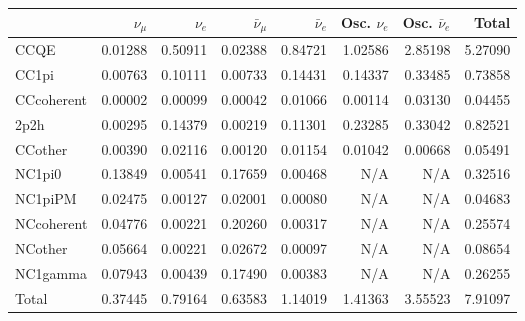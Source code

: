 \begin{tabular} { | l ||r | r | r | r | r | r | | r | }
\hline
              & $\nu_\mu$            & $\nu_e$              & $\bar{\nu}_{\mu}$    & $\bar{\nu}_{e}$      & Osc. $\nu_e$         & Osc. $\bar{\nu}_{e}$ & Total                \\ \hline\hline
 CCQE         & 0.01288              & 0.50911              & 0.02388              & 0.84721              & 1.02586              & 2.85198              & 5.27090              \\ \hline
 CC1pi        & 0.00763              & 0.10111              & 0.00733              & 0.14431              & 0.14337              & 0.33485              & 0.73858              \\ \hline
 CCcoherent   & 0.00002              & 0.00099              & 0.00042              & 0.01066              & 0.00114              & 0.03130              & 0.04455              \\ \hline
 2p2h         & 0.00295              & 0.14379              & 0.00219              & 0.11301              & 0.23285              & 0.33042              & 0.82521              \\ \hline
 CCother      & 0.00390              & 0.02116              & 0.00120              & 0.01154              & 0.01042              & 0.00668              & 0.05491              \\ \hline
 NC1pi0       & 0.13849              & 0.00541              & 0.17659              & 0.00468              & N/A                  & N/A                  & 0.32516              \\ \hline
 NC1piPM      & 0.02475              & 0.00127              & 0.02001              & 0.00080              & N/A                  & N/A                  & 0.04683              \\ \hline
 NCcoherent   & 0.04776              & 0.00221              & 0.20260              & 0.00317              & N/A                  & N/A                  & 0.25574              \\ \hline
 NCother      & 0.05664              & 0.00221              & 0.02672              & 0.00097              & N/A                  & N/A                  & 0.08654              \\ \hline
 NC1gamma     & 0.07943              & 0.00439              & 0.17490              & 0.00383              & N/A                  & N/A                  & 0.26255              \\ \hline
\hline
 Total        & 0.37445              & 0.79164              & 0.63583              & 1.14019              & 1.41363              & 3.55523              & 7.91097              \\ \hline

\end{tabular}
